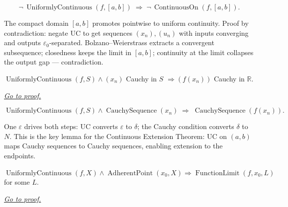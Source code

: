 \begin{remark*}
\[
  \neg\,\operatorname{UniformlyContinuous}(f,[a,b])
  \;\Rightarrow\;
  \neg\,\operatorname{ContinuousOn}(f,[a,b]).
\]
\end{remark*}

\begin{remark*}[Interpretation]
The compact domain $[a,b]$ promotes pointwise to uniform continuity.
Proof by contradiction: negate UC to get sequences $(x_n),(u_n)$
with inputs converging and outputs $\varepsilon_0$-separated.
Bolzano--Weierstrass extracts a convergent subsequence; closedness
keeps the limit in $[a,b]$; continuity at the limit collapses the
output gap — contradiction.
\end{remark*}


\begin{proposition}
\label{prop:uniform-continuity-cauchy}
$\operatorname{UniformlyContinuous}(f,S)\wedge(x_n)$ Cauchy in $S$
$\Rightarrow(f(x_n))$ Cauchy in $\mathbb{R}$.

\smallskip\noindent
\hyperref[prf:cauchy-sequences-preserved]{\textit{Go to proof.}}
\end{proposition}

\begin{remark*}
\[
  \operatorname{UniformlyContinuous}(f,S)
  \wedge \operatorname{CauchySequence}(x_n)
  \;\Rightarrow\;
  \operatorname{CauchySequence}(f(x_n)).
\]
\end{remark*}

\begin{remark*}[Interpretation]
One $\varepsilon$ drives both steps: UC converts $\varepsilon$ to
$\delta$; the Cauchy condition converts $\delta$ to $N$. This is the
key lemma for the Continuous Extension Theorem: UC on $(a,b)$ maps
Cauchy sequences to Cauchy sequences, enabling extension to the
endpoints.
\end{remark*}


\begin{corollary}
\label{cor:uniform-continuity-limit-at-adherent}
$\operatorname{UniformlyContinuous}(f,X)\wedge
\operatorname{AdherentPoint}(x_0,X)
\Rightarrow\operatorname{FunctionLimit}(f,x_0,L)$ for some $L$.

\smallskip\noindent
\hyperref[prf:uniform-continuity-limit-at-adherent]{\textit{Go to proof.}}
\end{corollary}

